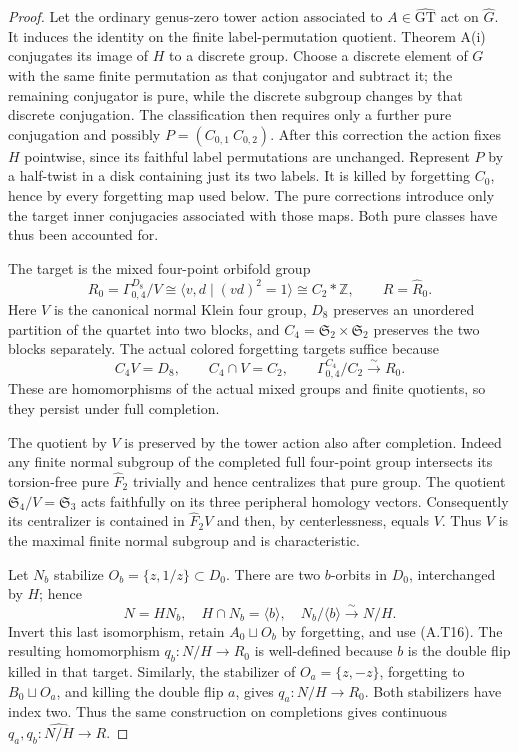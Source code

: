 \begin{proof}
Let the ordinary genus-zero tower action associated to
$A\in\widehat{\mathrm{GT}}$ act on $\widehat G$.  It induces
the identity on the finite label-permutation quotient.
Theorem A(i) conjugates its image of $H$ to a discrete group.
Choose a discrete element of $G$ with the same finite
permutation as that conjugator and subtract it; the remaining
conjugator is pure, while the discrete subgroup changes by
that discrete conjugation.  The classification then requires
only a further pure conjugation and possibly
$P=(C_{0,1}\ C_{0,2})$.  After this correction the action
fixes $H$ pointwise, since its faithful label permutations
are unchanged.  Represent $P$ by a half-twist in a disk
containing just its two labels.  It is killed by forgetting
$C_0$, hence by every forgetting map used below.  The pure
corrections introduce only the target inner conjugacies
associated with those maps.  Both pure classes have thus been
accounted for.

The target is the mixed four-point orbifold group
\[
 R_0=\Gamma_{0,4}^{D_8}/V
       \cong\langle v,d\mid(vd)^2=1\rangle\cong C_2*\mathbb Z,
 \qquad R=\widehat R_0.                                  \tag{A.T15}
\]
Here $V$ is the canonical normal Klein four group, $D_8$
preserves an unordered partition of the quartet into two
blocks, and $C_4=\mathfrak S_2\times\mathfrak S_2$
preserves the two blocks separately.  The actual colored
forgetting targets suffice because
\[
 C_4V=D_8,\qquad C_4\cap V=C_2,
 \qquad \Gamma_{0,4}^{C_4}/C_2\xrightarrow{\sim}R_0.      \tag{A.T16}
\]
These are homomorphisms of the actual mixed groups and finite
quotients, so they persist under full completion.

The quotient by $V$ is preserved by the tower action also
after completion.  Indeed any finite normal subgroup of the
completed full four-point group intersects its torsion-free
pure $\widehat F_2$ trivially and hence centralizes that pure
group.  The quotient $\mathfrak S_4/V=\mathfrak S_3$ acts
faithfully on its three peripheral homology vectors.
Consequently its centralizer is contained in
$\widehat F_2V$ and then, by centerlessness, equals $V$.
Thus $V$ is the maximal finite normal subgroup and is
characteristic.

Let $N_b$ stabilize $O_b=\{z,1/z\}\subset D_0$.
There are two $b$-orbits in $D_0$, interchanged by $H$;
hence
\[
 N=HN_b,\quad H\cap N_b=\langle b\rangle,
 \quad N_b/\langle b\rangle\xrightarrow{\sim}N/H.         \tag{A.T17}
\]
Invert this last isomorphism, retain $A_0\sqcup O_b$ by
forgetting, and use (A.T16).  The resulting homomorphism
$q_b:N/H\to R_0$ is well-defined because $b$ is the double
flip killed in that target.  Similarly, the stabilizer of
$O_a=\{z,-z\}$, forgetting to $B_0\sqcup O_a$, and killing
the double flip $a$, gives $q_a:N/H\to R_0$.
Both stabilizers have index two.  Thus the same construction
on completions gives continuous $q_a,q_b:\widehat{N/H}\to R$.


\end{proof}
